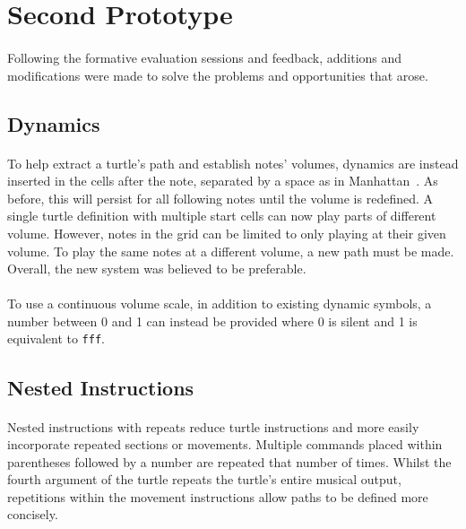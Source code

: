 \section{Second Prototype}

\paragraph{} Following the formative evaluation sessions and feedback, additions and modifications were made to solve the problems and opportunities that arose.

\subsection{Dynamics}

\paragraph{} To help extract a turtle's path and establish notes' volumes, dynamics are instead inserted in the cells after the note, separated by a space as in Manhattan~\cite{nash:manhattan}. As before, this will persist for all following notes until the volume is redefined. A single turtle definition with multiple start cells can now play parts of different volume. However, notes in the grid can be limited to only playing at their given volume. To play the same notes at a different volume, a new path must be made. Overall, the new system was believed to be preferable.

\paragraph{} To use a continuous volume scale, in addition to existing dynamic symbols, a number between 0 and 1 can instead be provided where 0 is silent and 1 is equivalent to \texttt{fff}.

\subsection{Nested Instructions}

\paragraph{} Nested instructions with repeats reduce turtle instructions and more easily incorporate repeated sections or movements. Multiple commands placed within parentheses followed by a number are repeated that number of times. Whilst the fourth argument of the turtle repeats the turtle's entire musical output, repetitions within the movement instructions allow paths to be defined more concisely.

